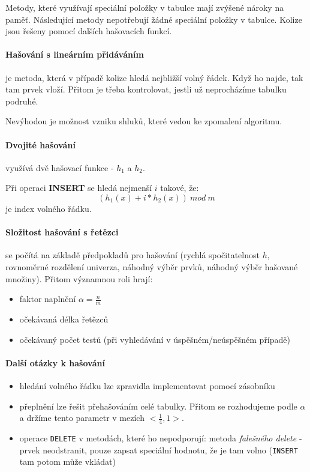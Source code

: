 \documentclass[a4paper]{article}      %
\begin{document}
Metody, které využívají speciální položky v tabulce mají zvýšené nároky na paměť. Následující metody nepotřebují žádné speciální položky v tabulce. Kolize jsou řešeny pomocí dalších hašovacích funkcí.

\paragraph{Hašování s lineárním přidáváním} je metoda, která v případě kolize hledá nejbližší volný řádek. Když ho najde, tak tam prvek vloží.
Přitom je třeba kontrolovat, jestli už neprocházíme tabulku podruhé.

Nevýhodou je možnost vzniku shluků, které vedou ke zpomalení algoritmu.

\paragraph{Dvojité hašování} využívá dvě hašovací funkce - $h_1$ a $h_2$.

Při operaci \textbf{INSERT} se hledá nejmenší $i$ takové, že:
\[
(h_1(x) + i*h_2(x))\ mod\ m
\]
je index volného řádku.

\paragraph{Složitost hašování s řetězci} se počítá na základě předpokladů pro hašování (rychlá spočitatelnost $h$, rovnoměrné rozdělení univerza, náhodný výběr prvků, náhodný výběr hašované množiny). Přitom významnou roli hrají:
\begin{itemize}
\item faktor naplnění $\alpha = \frac{n}{m}$
\item očekávaná délka řetězců
\item očekávaný počet testů (při vyhledávání v úspěšném/neúspěšném případě)
\end{itemize}

\paragraph{Další otázky k hašování}
\begin{itemize}
\item hledání volného řádku lze zpravidla implementovat pomocí zásobníku
\item přeplnění lze řešit přehašováním celé tabulky. Přitom se rozhodujeme podle $\alpha$ a držíme tento parametr v mezích $<\frac{1}{4}, 1>$.
\item operace \verb+DELETE+ v metodách, které ho nepodporují: metoda \emph{falešného delete} - prvek neodstranit, pouze zapsat speciální hodnotu, že je tam volno (\verb+INSERT+ tam potom může vkládat)
\end{itemize}
\end{document}
